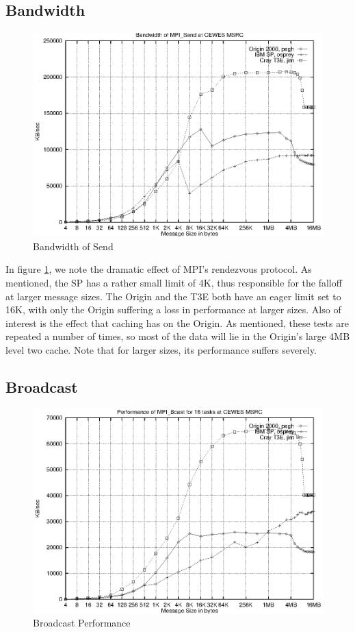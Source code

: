 \documentclass [12pt]{article}
\begin{document}
\subsection{Bandwidth}
\begin{figure}[Hht]
\centerline{\includegraphics{pics/cewes_mpi_bandwidth.ps}}
\caption{Bandwidth of Send}\label{bandwidth}
\end{figure}

In figure \ref{bandwidth}, we note the dramatic effect of MPI's rendezvous protocol. As mentioned,
the SP has a rather small limit of 4K, thus responsible for the falloff at
larger message sizes. The Origin and the T3E both have an eager limit set
to 16K, with only the Origin suffering a loss in performance at larger sizes.
Also of interest is the effect that caching has on the Origin. As mentioned,
these tests are repeated a number of times, so most of the data will lie
in the Origin's large 4MB level two cache. Note that for larger sizes,
its performance suffers severely.

\clearpage
\newpage

\subsection{Broadcast}
\begin{figure}[Hht]
\centerline{\includegraphics{pics/cewes_mpi_broadcast.ps}}
\caption{Broadcast Performance}\label{broadcast}
\end{figure}
\end{document}
